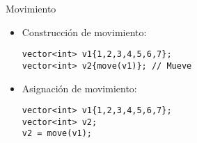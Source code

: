 \begin{frame}[t,fragile]{Movimiento}
\begin{itemize}
  \item Construcción de movimiento:
\begin{lstlisting}
vector<int> v1{1,2,3,4,5,6,7};
vector<int> v2{move(v1)}; // Mueve
\end{lstlisting}

  \item Asignación de movimiento:
\begin{lstlisting}
vector<int> v1{1,2,3,4,5,6,7};
vector<int> v2;
v2 = move(v1);
\end{lstlisting}
\end{itemize}
\end{frame}


